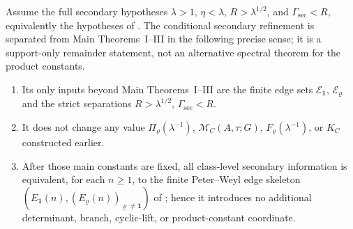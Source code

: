 \begin{theorem}
  \label{thm:secondary-edge-isolation}
  \label{prop:secondary-edge-isolation}
  Assume the full secondary hypotheses \(\lambda>1\),
  \(\eta<\lambda\), \(R>\lambda^{1/2}\), and
  \(\Gamma_{\mathrm{sec}}<R\), equivalently the hypotheses of
  .  The conditional secondary
  refinement is separated from Main Theorems~I--III in the following
  precise sense; it is a support-only remainder statement, not an alternative
  spectral theorem for the product constants.
  \begin{enumerate}[label=\textup{(\roman*)},leftmargin=*]
    \item Its only inputs beyond Main Theorems~I--III are the finite edge
    sets \(\mathcal E_{\mathbf1}\), \(\mathcal E_\varrho\) and the strict
    separations \(R>\lambda^{1/2}\), \(\Gamma_{\mathrm{sec}}<R\).
    \item It does not change any value
    \(\Pi_\varrho(\lambda^{-1})\), \(\mathcal M_C(A,\tau;G)\),
    \(F_\varrho(\lambda^{-1})\), or \(K_C\) constructed earlier.
    \item After those main constants are fixed, all class-level secondary
    information is equivalent, for each \(n\ge1\), to the
    finite Peter--Weyl edge skeleton
    \((E_{\mathbf1}(n),(E_\varrho(n))_{\varrho\ne\mathbf1})\) of
    ; hence it introduces no additional
    determinant, branch, cyclic-lift, or product-constant coordinate.
  \end{enumerate}
\end{theorem}

